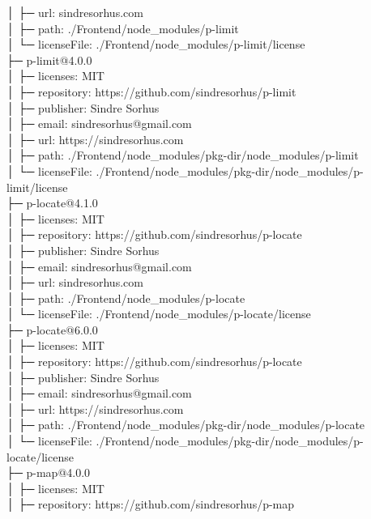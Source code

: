 \documentclass[
    paper=a4,
    twoside=false,
    parskip=half,
    listof=entryprefix,
    listof=totoc,
    index=totoc,
    bibliography=totoc,
    headsepline,
]{scrbook}
\begin{document}
    │  ├─ url: sindresorhus.com\\
    │  ├─ path: ./Frontend/node\_modules/p-limit\\
    │  └─ licenseFile: ./Frontend/node\_modules/p-limit/license\\
    ├─ p-limit@4.0.0\\
    │  ├─ licenses: MIT\\
    │  ├─ repository: https://github.com/sindresorhus/p-limit\\
    │  ├─ publisher: Sindre Sorhus\\
    │  ├─ email: sindresorhus@gmail.com\\
    │  ├─ url: https://sindresorhus.com\\
    │  ├─ path: ./Frontend/node\_modules/pkg-dir/node\_modules/p-limit\\
    │  └─ licenseFile: ./Frontend/node\_modules/pkg-dir/node\_modules/p-limit/license\\
    ├─ p-locate@4.1.0\\
    │  ├─ licenses: MIT\\
    │  ├─ repository: https://github.com/sindresorhus/p-locate\\
    │  ├─ publisher: Sindre Sorhus\\
    │  ├─ email: sindresorhus@gmail.com\\
    │  ├─ url: sindresorhus.com\\
    │  ├─ path: ./Frontend/node\_modules/p-locate\\
    │  └─ licenseFile: ./Frontend/node\_modules/p-locate/license\\
    ├─ p-locate@6.0.0\\
    │  ├─ licenses: MIT\\
    │  ├─ repository: https://github.com/sindresorhus/p-locate\\
    │  ├─ publisher: Sindre Sorhus\\
    │  ├─ email: sindresorhus@gmail.com\\
    │  ├─ url: https://sindresorhus.com\\
    │  ├─ path: ./Frontend/node\_modules/pkg-dir/node\_modules/p-locate\\
    │  └─ licenseFile: ./Frontend/node\_modules/pkg-dir/node\_modules/p-locate/license\\
    ├─ p-map@4.0.0\\
    │  ├─ licenses: MIT\\
    │  ├─ repository: https://github.com/sindresorhus/p-map\\
\end{document}
